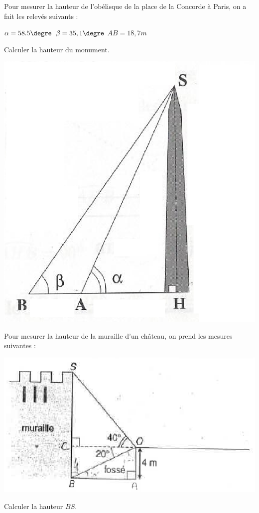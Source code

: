 \begin{exercice}
Pour mesurer la hauteur de l'obélisque de la place de la Concorde à Paris, on a fait les relevés suivants : 
\begin{multicols}{3}
$\alpha=58.5\textrm{\degre}$
$\beta=35,1\textrm{\degre}$
$AB=18,7m$
\end{multicols}
Calculer la hauteur du monument.
\begin{center}
\includegraphics[scale=0.6]{Trigonometrie/figures/obelisque.eps}
\end{center}
\end{exercice}

\begin{exercice}
Pour mesurer la hauteur de la muraille d'un château, on prend les mesures suivantes : 
\begin{center}
\includegraphics[scale=0.7]{Trigonometrie/figures/chateau.eps}
\end{center}
Calculer la hauteur $BS$.
\end{exercice}

